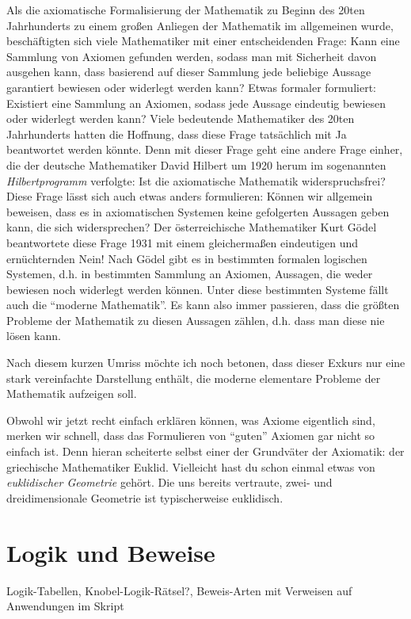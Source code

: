 \begin{exkurs}
    Als die axiomatische Formalisierung der Mathematik zu Beginn des 20ten Jahrhunderts zu einem großen Anliegen der Mathematik im allgemeinen wurde, beschäftigten sich viele Mathematiker mit einer entscheidenden Frage: Kann eine Sammlung von Axiomen gefunden werden, sodass man mit Sicherheit davon ausgehen kann, dass basierend auf dieser Sammlung jede beliebige Aussage garantiert bewiesen oder widerlegt werden kann? Etwas formaler formuliert: Existiert eine Sammlung an Axiomen, sodass jede Aussage eindeutig bewiesen oder widerlegt werden kann? Viele bedeutende Mathematiker des 20ten Jahrhunderts hatten die Hoffnung, dass diese Frage tatsächlich mit Ja beantwortet werden könnte. Denn mit dieser Frage geht eine andere Frage einher, die der deutsche Mathematiker David Hilbert um 1920 herum im sogenannten \textit{Hilbertprogramm} verfolgte: Ist die axiomatische Mathematik widerspruchsfrei? Diese Frage lässt sich auch etwas anders formulieren: Können wir allgemein beweisen, dass es in axiomatischen Systemen keine gefolgerten Aussagen geben kann, die sich widersprechen? Der österreichische Mathematiker Kurt Gödel beantwortete diese Frage 1931 mit einem gleichermaßen eindeutigen und ernüchternden Nein! Nach Gödel gibt es in bestimmten formalen logischen Systemen, d.h. in bestimmten Sammlung an Axiomen, Aussagen, die weder bewiesen noch widerlegt werden können. Unter diese bestimmten Systeme fällt auch die "`moderne Mathematik"'. Es kann also immer passieren, dass die größten Probleme der Mathematik zu diesen Aussagen zählen, d.h. dass man diese nie lösen kann. 

    Nach diesem kurzen Umriss möchte ich noch betonen, dass dieser Exkurs nur eine stark vereinfachte Darstellung enthält, die moderne elementare Probleme der Mathematik aufzeigen soll. 
\end{exkurs}

Obwohl wir jetzt recht einfach erklären können, was Axiome eigentlich sind, merken wir schnell, dass das Formulieren von "`guten"' Axiomen gar nicht so einfach ist. Denn hieran scheiterte selbst einer der Grundväter der Axiomatik: der griechische Mathematiker Euklid. Vielleicht hast du schon einmal etwas von \textit{euklidischer Geometrie} gehört. Die uns bereits vertraute, zwei- und dreidimensionale Geometrie ist typischerweise euklidisch. 

\section{Logik und Beweise}
Logik-Tabellen, Knobel-Logik-Rätsel?, Beweis-Arten mit Verweisen auf Anwendungen im Skript

